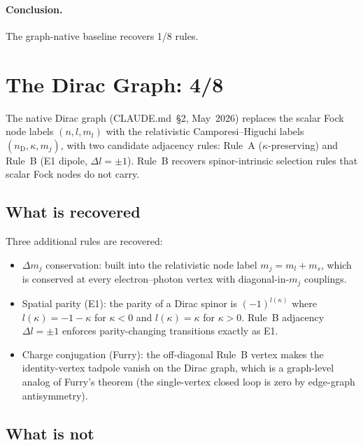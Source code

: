 \documentclass[11pt]{article}
\begin{document}
\paragraph{Conclusion.}  The graph-native baseline recovers 1/8 rules.

\section{The Dirac Graph: 4/8}
\label{sec:dirac_graph}

The native Dirac graph (CLAUDE.md~\S 2, May~2026) replaces the scalar
Fock node labels $(n, l, m_l)$ with the relativistic
Camporesi--Higuchi labels $(n_{\mathrm{D}}, \kappa, m_j)$, with two
candidate adjacency rules: Rule~A ($\kappa$-preserving) and Rule~B
(E1 dipole, $\Delta l = \pm 1$).  Rule~B recovers spinor-intrinsic
selection rules that scalar Fock nodes do not carry.

\subsection{What is recovered}

Three additional rules are recovered:

\begin{itemize}\setlength{\itemsep}{2pt}
\item[(\textbf{R4})] $\Delta m_j$ conservation: built into the
relativistic node label $m_j = m_l + m_s$, which is conserved at
every electron--photon vertex with diagonal-in-$m_j$ couplings.
\item[(\textbf{R5})] Spatial parity (E1): the parity of a Dirac
spinor is $(-1)^{l(\kappa)}$ where $l(\kappa) = -1 - \kappa$ for
$\kappa < 0$ and $l(\kappa) = \kappa$ for $\kappa > 0$.  Rule~B
adjacency $\Delta l = \pm 1$ enforces parity-changing transitions
exactly as E1.
\item[(\textbf{R7})] Charge conjugation (Furry): the off-diagonal
Rule~B vertex makes the identity-vertex tadpole vanish on the Dirac
graph, which is a graph-level analog of Furry's theorem (the
single-vertex closed loop is zero by edge-graph antisymmetry).
\end{itemize}

\subsection{What is not}
\end{document}

